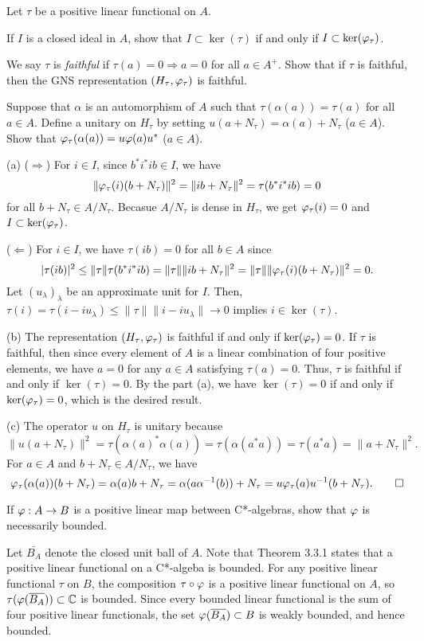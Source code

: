 \documentclass{article}
\begin{document}
\begin{prb}
Let $\tau$ be a positive linear functional on $A$.
\begin{parts}
\item
If $I$ is a closed ideal in $A$, show that $I\subset\ker(\tau)$ if and only if $I\subset\ker(\varphi_\tau)$.
\item
We say $\tau$ is \emph{faithful} if $\tau(a)=0\Rightarrow a=0$ for all $a\in A^+$.
Show that if $\tau$ is faithful, then the GNS representation $(H_\tau,\varphi_\tau)$ is faithful.
\item
Suppose that $\alpha$ is an automorphism of $A$ such that $\tau(\alpha(a))=\tau(a)$ for all $a\in A$.
Define a unitary on $H_\tau$ by setting $u(a+N_\tau)=\alpha(a)+N_\tau$ ($a\in A$).
Show that $\varphi_\tau(\alpha(a))=u\varphi(a)u^*$ ($a\in A$).
\end{parts}
\end{prb}
\begin{sol}
(a)
($\Rightarrow$)
For $i\in I$, since $b^*i^*ib\in I$, we have
\[\|\varphi_\tau(i)(b+N_\tau)\|^2=\|ib+N_\tau\|^2=\tau(b^*i^*ib)=0\]
for all $b+N_\tau\in A/N_\tau$.
Becasue $A/N_\tau$ is dense in $H_\tau$, we get $\varphi_\tau(i)=0$ and $I\subset\ker(\varphi_\tau)$.

($\Leftarrow$)
For $i\in I$, we have $\tau(ib)=0$ for all $b\in A$ since
\[|\tau(ib)|^2\le\|\tau\|\tau(b^*i^*ib)=\|\tau\|\|ib+N_\tau\|^2=\|\tau\|\|\varphi_\tau(i)(b+N_\tau)\|^2=0.\]
Let $(u_\lambda)_\lambda$ be an approximate unit for $I$.
Then, $\tau(i)=\tau(i-iu_\lambda)\le\|\tau\|\|i-iu_\lambda\|\to0$ implies $i\in\ker(\tau)$.

(b)
The representation $(H_\tau,\varphi_\tau)$ is faithful if and only if $\ker(\varphi_\tau)=0$.
If $\tau$ is faithful, then since every element of $A$ is a linear combination of four positive elements, we have $a=0$ for any $a\in A$ satisfying $\tau(a)=0$.
Thus, $\tau$ is faithful if and only if $\ker(\tau)=0$.
By the part (a), we have $\ker(\tau)=0$ if and only if $\ker(\varphi_\tau)=0$, which is the desired result.

(c)
The operator $u$ on $H_\tau$ is unitary because
\[\|u(a+N_\tau)\|^2=\tau(\alpha(a)^*\alpha(a))=\tau(\alpha(a^*a))=\tau(a^*a)=\|a+N_\tau\|^2.\]
For $a\in A$ and $b+N_\tau\in A/N_\tau$, we have
\[\varphi_\tau(\alpha(a))(b+N_\tau)=\alpha(a)b+N_\tau=\alpha(a\alpha^{-1}(b))+N_\tau=u\varphi_\tau(a)u^{-1}(b+N_\tau).\qedhere\]
\end{sol}


\begin{prb}
If $\varphi:A\to B$ is a positive linear map between C*-algebras, show that $\varphi$ is necessarily bounded.
\end{prb}
\begin{sol}
Let $\bar{B_A}$ denote the closed unit ball of $A$.
Note that Theorem 3.3.1 states that a positive linear functional on a C*-algeba is bounded.
For any positive linear functional $\tau$ on $B$, the composition $\tau\circ\varphi$ is a positive linear functional on $A$, so $\tau(\varphi(\overline{B_A}))\subset\mathbb{C}$ is bounded.
Since every bounded linear functional is the sum of four positive linear functionals, the set $\varphi(\overline{B_A})\subset B$ is weakly bounded, and hence bounded.
\end{sol}
\end{document}

